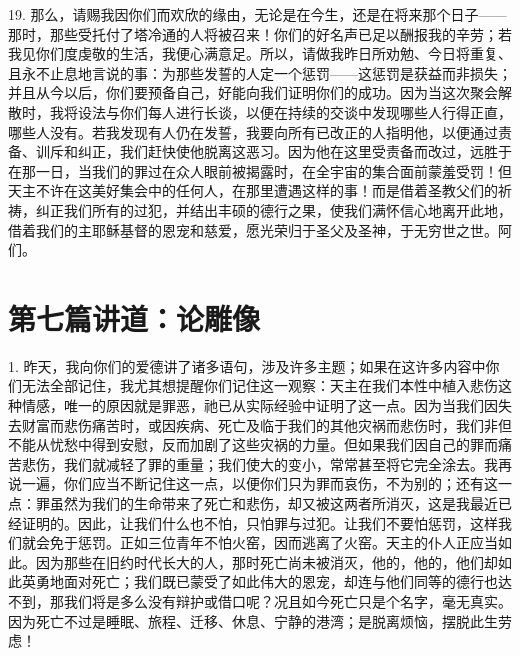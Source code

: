19. 那么，请赐我因你们而欢欣的缘由，无论是在今生，还是在将来那个日子——那时，那些受托付了塔冷通的人将被召来！你们的好名声已足以酬报我的辛劳；若我见你们度虔敬的生活，我便心满意足。所以，请做我昨日所劝勉、今日将重复、且永不止息地言说的事：为那些发誓的人定一个惩罚——这惩罚是获益而非损失；并且从今以后，你们要预备自己，好能向我们证明你们的成功。因为当这次聚会解散时，我将设法与你们每人进行长谈，以便在持续的交谈中发现哪些人行得正直，哪些人没有。若我发现有人仍在发誓，我要向所有已改正的人指明他，以便通过责备、训斥和纠正，我们赶快使他脱离这恶习。因为他在这里受责备而改过，远胜于在那一日，当我们的罪过在众人眼前被揭露时，在全宇宙的集合面前蒙羞受罚！但天主不许在这美好集会中的任何人，在那里遭遇这样的事！而是借着圣教父们的祈祷，纠正我们所有的过犯，并结出丰硕的德行之果，使我们满怀信心地离开此地，借着我们的主耶稣基督的恩宠和慈爱，愿光荣归于圣父及圣神，于无穷世之世。阿们。\par



\section{第七篇讲道：论雕像}

\par

1. 昨天，我向你们的爱德讲了诸多语句，涉及许多主题；如果在这许多内容中你们无法全部记住，我尤其想提醒你们记住这一观察：天主在我们本性中植入悲伤这种情感，唯一的原因就是罪恶，祂已从实际经验中证明了这一点。因为当我们因失去财富而悲伤痛苦时，或因疾病、死亡及临于我们的其他灾祸而悲伤时，我们非但不能从忧愁中得到安慰，反而加剧了这些灾祸的力量。但如果我们因自己的罪而痛苦悲伤，我们就减轻了罪的重量；我们使大的变小，常常甚至将它完全涂去。我再说一遍，你们应当不断记住这一点，以便你们只为罪而哀伤，不为别的；还有这一点：罪虽然为我们的生命带来了死亡和悲伤，却又被这两者所消灭，这是我最近已经证明的。因此，让我们什么也不怕，只怕罪与过犯。让我们不要怕惩罚，这样我们就会免于惩罚。正如三位青年不怕火窑，因而逃离了火窑。天主的仆人正应当如此。因为那些在旧约时代长大的人，那时死亡尚未被消灭，他的，他的，他们却如此英勇地面对死亡；我们既已蒙受了如此伟大的恩宠，却连与他们同等的德行也达不到，那我们将是多么没有辩护或借口呢？况且如今死亡只是个名字，毫无真实。因为死亡不过是睡眠、旅程、迁移、休息、宁静的港湾；是脱离烦恼，摆脱此生劳虑！\par

